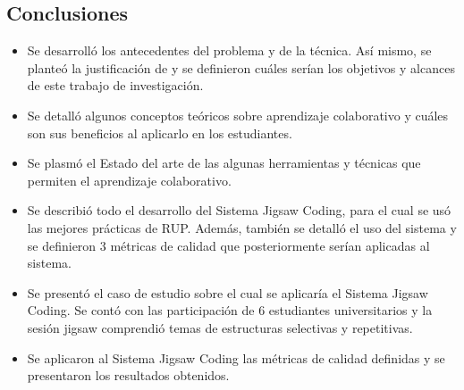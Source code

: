 \documentclass[twoside]{article}
\begin{document}
\begin{multicols}{2}
\section{Conclusiones}
\begin{itemize}
	\item Se desarrolló los antecedentes del problema y de la técnica. Así mismo, se planteó la justificación de y se definieron cuáles serían los objetivos y alcances de este trabajo de investigación.
	\item Se detalló algunos conceptos teóricos sobre aprendizaje colaborativo y cuáles son sus beneficios al aplicarlo en los estudiantes.
	\item Se plasmó el Estado del arte de las algunas herramientas y técnicas que permiten el aprendizaje colaborativo. 
	\item Se describió todo el desarrollo del Sistema Jigsaw Coding, para el cual se usó las mejores prácticas de RUP. Además, también se detalló el uso del sistema y se definieron 3 métricas de calidad que posteriormente serían aplicadas al sistema.
	\item Se presentó el caso de estudio sobre el cual se aplicaría el Sistema Jigsaw Coding. Se contó con las participación de 6 estudiantes universitarios y la sesión jigsaw comprendió temas de estructuras selectivas y repetitivas.
	\item Se aplicaron al Sistema Jigsaw Coding las métricas de calidad definidas y se presentaron los resultados obtenidos.
\end{itemize}



%
% 


\end{multicols}
\end{document}
